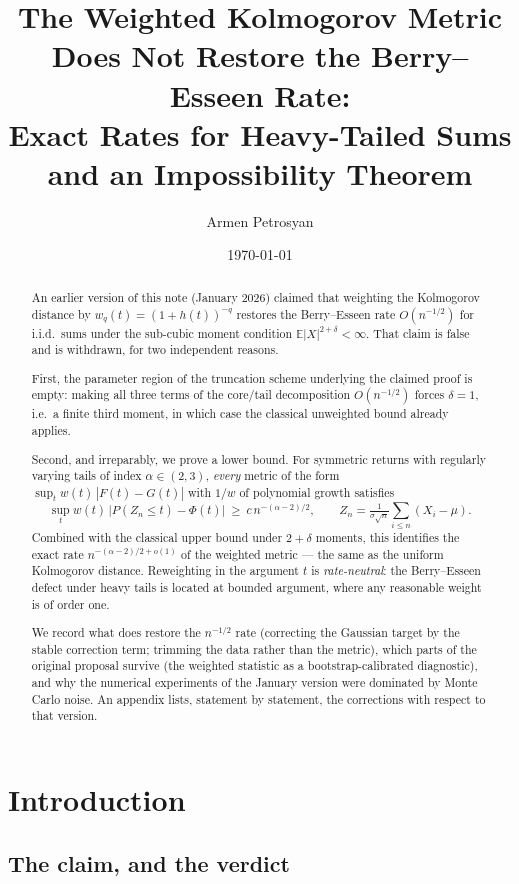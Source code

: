 \documentclass[11pt,a4paper]{article}
\title{\textbf{The Weighted Kolmogorov Metric Does Not Restore the Berry--Esseen Rate:} \\
\large Exact Rates for Heavy-Tailed Sums and an Impossibility Theorem}
\author{Armen Petrosyan}
\date{\today}
\theoremstyle{plain}
\theoremstyle{definition}
\theoremstyle{remark}
\numberwithin{equation}{section}
\newcommand{\E}{\mathbb{E}}
\newcommand{\1}{\mathbbm{1}}
\newcommand{\h}{h}
\begin{document}
\maketitle

\begin{abstract}
An earlier version of this note (January 2026) claimed that weighting the Kolmogorov
distance by $w_q(t)=(1+\h(t))^{-q}$ restores the Berry--Esseen rate $O(n^{-1/2})$ for
i.i.d.\ sums under the sub-cubic moment condition $\E|X|^{2+\delta}<\infty$. That claim
is false and is withdrawn, for two independent reasons.

First, the parameter region of the truncation scheme underlying the claimed proof is
empty: making all three terms of the core/tail decomposition $O(n^{-1/2})$ forces
$\delta=1$, i.e.\ a finite third moment, in which case the classical unweighted bound
already applies.

Second, and irreparably, we prove a lower bound. For symmetric returns with regularly
varying tails of index $\alpha\in(2,3)$, \emph{every} metric of the form
$\sup_t w(t)\,|F(t)-G(t)|$ with $1/w$ of polynomial growth satisfies
\[
\sup_t w(t)\,\big|P(Z_n\le t)-\Phi(t)\big|\ \ge\ c\, n^{-(\alpha-2)/2},
\qquad Z_n=\tfrac{1}{\sigma\sqrt n}\textstyle\sum_{i\le n}(X_i-\mu).
\]
Combined with the classical upper bound under $2+\delta$ moments, this identifies the
exact rate $n^{-(\alpha-2)/2+o(1)}$ of the weighted metric --- the same as the uniform
Kolmogorov distance. Reweighting in the argument $t$ is \emph{rate-neutral}: the
Berry--Esseen defect under heavy tails is located at bounded argument, where any
reasonable weight is of order one.

We record what does restore the $n^{-1/2}$ rate (correcting the Gaussian target by the
stable correction term; trimming the data rather than the metric), which parts of the
original proposal survive (the weighted statistic as a bootstrap-calibrated diagnostic),
and why the numerical experiments of the January version were dominated by Monte Carlo
noise. An appendix lists, statement by statement, the corrections with respect to that
version.
\end{abstract}

\section{Introduction}

\subsection{The claim, and the verdict}
\end{document}
